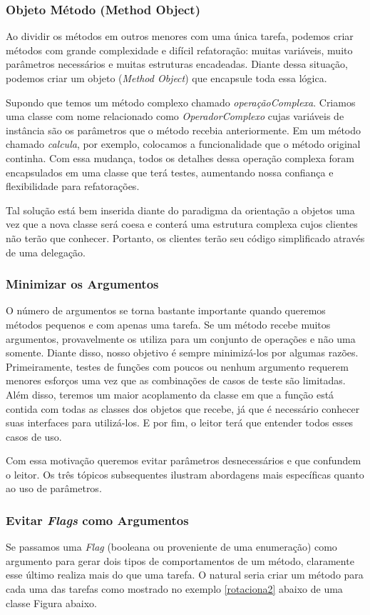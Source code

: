 \subsubsection{Objeto Método (Method Object)}
\label{objeto_metodo}
Ao dividir os métodos em outros menores com uma única tarefa, podemos criar métodos com grande complexidade e difícil refatoração: muitas variáveis, muito parâmetros necessários e muitas estruturas encadeadas. Diante dessa situação, podemos criar um objeto (\textit{Method Object}) que encapsule toda essa lógica.
	
Supondo que temos um método complexo chamado \textit{operaçãoComplexa}. Criamos uma classe com nome relacionado como \textit{OperadorComplexo} cujas variáveis de instância são os parâmetros que o método recebia anteriormente. Em um método chamado \textit{calcula}, por exemplo, colocamos a funcionalidade que o método original continha. Com essa mudança, todos os detalhes dessa operação complexa foram encapsulados em uma classe que terá testes, aumentando nossa confiança e flexibilidade para refatorações.
	
Tal solução está bem inserida diante do paradigma da orientação a objetos uma vez que a nova classe será coesa e conterá uma estrutura complexa cujos clientes não terão que conhecer. Portanto, os clientes terão seu código simplificado através de uma delegação.

\subsubsection{Minimizar os Argumentos}
O número de argumentos se torna bastante importante quando queremos métodos pequenos e com apenas uma tarefa. Se um método recebe muitos argumentos, provavelmente os utiliza para um conjunto de operações e não uma somente. Diante disso, nosso objetivo é sempre minimizá-los por algumas razões. Primeiramente, testes de funções com poucos ou nenhum argumento requerem menores esforços  uma vez que as combinações de casos de teste são limitadas. Além disso, teremos um maior acoplamento da classe em que a função está contida com todas as classes dos objetos que recebe, já que é necessário conhecer suas interfaces para utilizá-los. E por fim, o leitor terá que entender todos esses casos de uso.

Com essa motivação queremos evitar parâmetros desnecessários e que confundem o leitor. Os três tópicos subsequentes ilustram abordagens mais específicas quanto ao uso de parâmetros.

\subsubsection{Evitar \textit{Flags} como Argumentos}
Se passamos uma \textit{Flag} (booleana ou proveniente de uma enumeração) como argumento para gerar dois tipos de comportamentos de um método, claramente esse último realiza mais do que uma tarefa. O natural seria criar um método para cada uma das tarefas como mostrado no exemplo \ref{rotaciona2} abaixo de uma classe Figura abaixo.

